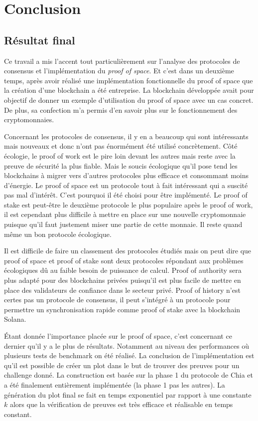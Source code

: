\chapter{Conclusion}

\section{Résultat final}

Ce travail a mis l'accent tout particulièrement sur l'analyse des protocoles de consensus et l'implémentation du \emph{proof of space}. Et c'est dans un deuxième temps, après avoir réalisé une implémentation fonctionnelle du proof of space que la création d'une blockchain a été entreprise. La blockchain développée avait pour objectif de donner un exemple d'utilisation du proof of space avec un cas concret. De plus, sa confection m'a permis d'en savoir plus sur le fonctionnement des cryptomonnaies.

Concernant les protocoles de consensus, il y en a beaucoup qui sont intéressants mais nouveaux et donc n'ont pas énormément été utilisé concrètement. Côté écologie, le proof of work est le pire loin devant les autres mais reste avec la preuve de sécurité la plus fiable. Mais le soucis écologique qu'il pose tend les blockchains à migrer vers d'autres protocoles plus efficace et consommant moins d'énergie. Le proof of space est un protocole tout à fait intéressant qui a suscité pas mal d'intérêt. C'est pourquoi il été choisi pour être implémenté. Le proof of stake est peut-être le deuxième protocole le plus populaire après le proof of work, il est cependant plus difficile à mettre en place sur une nouvelle cryptomonnaie puisque qu'il faut justement miser une partie de cette monnaie. Il reste quand même un bon protocole écologique.

Il est difficile de faire un classement des protocoles étudiés mais on peut dire que proof of space et proof of stake sont deux protocoles répondant aux problèmes écologiques dû au faible besoin de puissance de calcul. Proof of authority sera plus adapté pour des blockchains privées puisqu'il est plus facile de mettre en place des validateurs de confiance dans le secteur privé. Proof of history n'est certes pas un protocole de consensus, il peut s'intégré à un protocole pour permettre un synchronisation rapide comme proof of stake avec la blockchain Solana.

Étant donnée l'importance placée sur le proof of space, c'est concernant ce dernier qu'il y a le plus de résultats. Notamment au niveau des performances où plusieurs tests de benchmark on été réalisé. La conclusion de l'implémentation est qu'il est possible de créer un plot dans le but de trouver des preuves pour un challenge donné. La construction est basée sur la phase 1 du protocole de Chia \cite{chia:construction} et a été finalement entièrement implémentée (la phase 1 pas les autres). La génération du plot final se fait en temps exponentiel par rapport à une constante $k$ alors que la vérification de preuves est très efficace et réalisable en temps constant.

